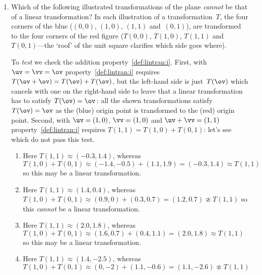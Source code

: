 \begin{example}
\begin{enumerate}
\item\label{eg:LTtwoDg} Which of the following illustrated transformations of the plane \emph{cannot} be that of a linear transformation?
In each illustration of a transformation~\(T\), the four corners of the blue  (\((0,0)\), \((1,0)\), \((1,1)\) and~\((0,1)\)), are transformed to the four corners of the red figure (\(T(0,0)\), \(T(1,0)\), \(T(1,1)\) and~\(T(0,1)\)---the `roof' of the unit square clarifies which side goes where).
\begin{solution} 
To \emph{test} we check the addition property~\ref{def:lintran:i}.
First, with \(\uv=\vv=\ov\) property~\ref{def:lintran:i} requires \(T(\ov+\ov)=T(\ov)+T(\ov)\), but the left-hand side is just~\(T(\ov)\) which cancels with one on the right-hand side to leave that a linear transformation has to satisfy \(T(\ov)=\ov\)\,: all the shown transformations satisfy \(T(\ov)=\ov\) as the (blue) origin point is transformed to the (red) origin point.
Second, with \(\uv=(1,0)\), \(\vv=(1,0)\) and \(\uv+\vv=(1,1)\) property~\ref{def:lintran:i} requires \(T(1,1)=T(1,0)+T(0,1)\): let's see which do not pass this test.
\begin{enumerate}
\item Here \(T(1,1)\approx(-0.3,1.4)\), whereas
\(T(1,0)+T(0,1)\approx (-1.4,-0.5)+(1.1,1.9)
=(-0.3,1.4)\approx T(1,1)\) 
so this may be a linear transformation.
\item Here \(T(1,1)\approx(1.4,0.4)\), whereas
\(T(1,0)+T(0,1)\approx (0.9,0)+(0.3,0.7)
=(1.2,0.7)\not\approx T(1,1)\) 
so this \emph{cannot} be a linear transformation.
\item Here \(T(1,1)\approx(2.0,1.8)\), whereas
\(T(1,0)+T(0,1)\approx (1.6,0.7)+(0.4,1.1)
=(2.0,1.8)\approx T(1,1)\) 
so this may be a linear transformation.
\item Here \(T(1,1)\approx(1.4,-2.5)\), whereas
\(T(1,0)+T(0,1)\approx (0,-2)+(1.1,-0.6)
=(1.1,-2.6)\not\approx T(1,1)\) 

\end{enumerate}
\end{solution}
\end{enumerate}
\end{example}
